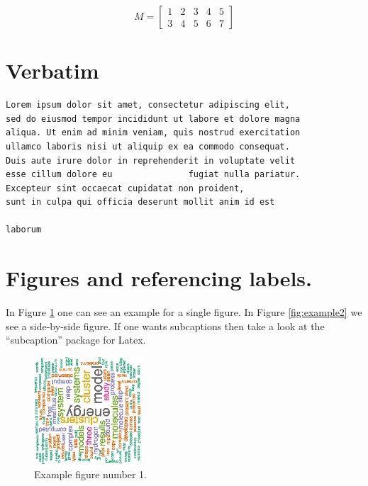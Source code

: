 \documentclass{article}
\begin{document}
\begin{equation}
  M=
  \begin{bmatrix}
    1 & 2 & 3 & 4 & 5 \\
    3 & 4 & 5 & 6 & 7
  \end{bmatrix}
\end{equation}

\section{Verbatim}

\begin{verbatim}
Lorem ipsum dolor sit amet, consectetur adipiscing elit,
sed do eiusmod tempor incididunt ut labore et dolore magna
aliqua. Ut enim ad minim veniam, quis nostrud exercitation
ullamco laboris nisi ut aliquip ex ea commodo consequat.
Duis aute irure dolor in reprehenderit in voluptate velit
esse cillum dolore eu               fugiat nulla pariatur.
Excepteur sint occaecat cupidatat non proident,
sunt in culpa qui officia deserunt mollit anim id est

laborum
\end{verbatim}

\section{Figures and referencing labels.}

In Figure \ref{fig:example1} one can see an example for a single figure. In Figure \ref{fig:example2} we see a side-by-side figure. If one wants subcaptions then take a look at the ``subcaption'' package for Latex.

\begin{figure}[h!]
  \centering
  \includegraphics[width=4cm]{papers_2010_2015}
  \caption{Example figure number 1.}
  \label{fig:example1}
\end{figure}
\end{document}
